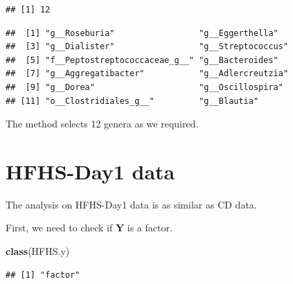 \documentclass[openany]{book}
\newenvironment{Shaded}{\begin{snugshade}}{\end{snugshade}}
\newcommand{\KeywordTok}[1]{\textcolor[rgb]{0.13,0.29,0.53}{\textbf{#1}}}
\newcommand{\DataTypeTok}[1]{\textcolor[rgb]{0.13,0.29,0.53}{#1}}
\newcommand{\DecValTok}[1]{\textcolor[rgb]{0.00,0.00,0.81}{#1}}
\newcommand{\StringTok}[1]{\textcolor[rgb]{0.31,0.60,0.02}{#1}}
\newcommand{\CommentTok}[1]{\textcolor[rgb]{0.56,0.35,0.01}{\textit{#1}}}
\newcommand{\OperatorTok}[1]{\textcolor[rgb]{0.81,0.36,0.00}{\textbf{#1}}}
\newcommand{\NormalTok}[1]{#1}
\begin{document}
\begin{verbatim}
## [1] 12
\end{verbatim}

\begin{Shaded}
\end{Shaded}

\begin{verbatim}
##  [1] "g__Roseburia"                 "g__Eggerthella"              
##  [3] "g__Dialister"                 "g__Streptococcus"            
##  [5] "f__Peptostreptococcaceae_g__" "g__Bacteroides"              
##  [7] "g__Aggregatibacter"           "g__Adlercreutzia"            
##  [9] "g__Dorea"                     "g__Oscillospira"             
## [11] "o__Clostridiales_g__"         "g__Blautia"
\end{verbatim}

The method selects 12 genera as we required.

\section{HFHS-Day1 data}\label{hfhs-day1-data-2}

The analysis on HFHS-Day1 data is as similar as CD data.

First, we need to check if \textbf{Y} is a factor.

\begin{Shaded}
\begin{Highlighting}[]
\KeywordTok{class}\NormalTok{(HFHS.y)}
\end{Highlighting}
\end{Shaded}

\begin{verbatim}
## [1] "factor"
\end{verbatim}

\begin{Shaded}
\end{Shaded}
\end{document}
